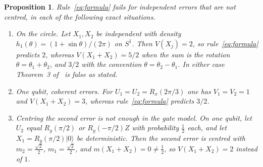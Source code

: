 \documentclass[11pt,a4paper]{article}
\newtheorem{proposition}[theorem]{Proposition}
\theoremstyle{definition}
\theoremstyle{plain}
\newcommand{\ket}[1]{\lvert#1\rangle}
\begin{document}
\begin{proposition}\label{prop:counter}
Rule~\eqref{eq:formula} fails for independent errors that are not centred, in
each of the following exact situations.
\begin{enumerate}
\item[(a)] \emph{On the circle.} Let $X_1,X_2$ be independent with density
$h_1(\theta)=(1+\sin\theta)/(2\pi)$ on $S^1$. Then $V(X_j)=2$, so
rule~\eqref{eq:formula} predicts $2$, whereas $V(X_1+X_2)=5/2$ when the sum
is the rotation $\theta=\theta_1+\theta_2$, and $3/2$ with the convention
$\theta=\theta_2-\theta_1$. In either case Theorem~3
of~\cite{LacallePozo2019} is false as stated.
\item[(b)] \emph{One qubit, coherent errors.} For $U_1=U_2=R_x(2\pi/3)$ one has
$V_1=V_2=1$ and $V(X_1+X_2)=3$, whereas rule~\eqref{eq:formula} predicts
$3/2$.
\item[(c)] \emph{Centring the second error is not enough in the gate model.}
On one qubit, let $U_2$ equal $R_y(\pi/2)$ or $R_y(-\pi/2)Z$ with probability
$\tfrac12$ each, and let $X_1=R_y(\pi/2)\ket0$ be deterministic. Then the
second error is centred with $m_2=\tfrac{\sqrt2}2$, $m_1=\tfrac{\sqrt2}2$, and
$m(X_1+X_2)=0\ne\tfrac12$, so $V(X_1+X_2)=2$ instead of $1$.
\end{enumerate}
\end{proposition}
\end{document}
